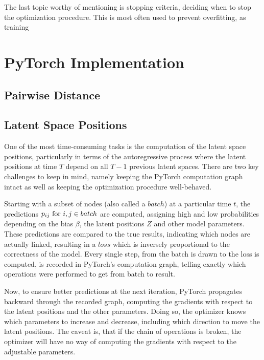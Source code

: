             The last topic worthy of mentioning is stopping criteria, deciding when to stop the optimization procedure. This is most often used to prevent overfitting, as training 
    
\section{PyTorch Implementation}

    \subsection{Pairwise Distance}
    
    \subsection{Latent Space Positions}
    
        One of the most time-consuming tasks is the computation of the latent space positions, particularly in terms of the autoregressive process where the latent positions at time $T$ depend on all $T-1$ previous latent spaces.
        There are two key challenges to keep in mind, namely keeping the PyTorch computation graph intact as well as keeping the optimization procedure well-behaved. 
        
        Starting with a subset of nodes (also called a $batch$) at a particular time $t$, the predictions $\sub(p)\text{ for } i,j \in batch$ are computed, assigning high and low probabilities depending on the bias $\beta$, the latent positions $Z$ and other model parameters. These predictions are compared to the true results, indicating which nodes are actually linked, resulting in a $loss$ which is inversely proportional to the correctness of the model. Every single step, from the batch is drawn to the loss is computed, is recorded in PyTorch's computation graph, telling exactly which operations were performed to get from batch to result. 
        
        Now, to ensure better predictions at the next iteration, PyTorch propagates backward through the recorded graph, computing the gradients with respect to the latent positions and the other parameters. Doing so, the optimizer knows which parameters to increase and decrease, including which direction to move the latent positions.
        The caveat is, that if the chain of operations is broken, the optimizer will have no way of computing the gradients with respect to the adjustable parameters. 
        

